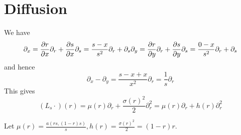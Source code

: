 \documentclass{article}
\begin{document}
{\section{Diffusion}

We have
\[
\partial_x
= \frac{\partial r}{\partial x}\partial_r + \frac{\partial s}{\partial x}\partial_s
= \frac{s - x}{s^2}\partial_r + \partial_s
\\\partial_y
= \frac{\partial r}{\partial y}\partial_r + \frac{\partial s}{\partial y}\partial_s
= \frac{0 - x}{s^2}\partial_r + \partial_s
\]
and hence
\[
\partial_x - \partial_y
= \frac{s - x + x}{x^2}\partial_r
= \frac{1}{s}\partial_r
\]
This gives
\[
(L_s \cdot)(r)
= \mu(r) \partial_r + \frac{\sigma(r)^2}{2} \partial_r^2
= \mu(r) \partial_r + h(r) \partial_r^2
\]

Let $\mu(r) = \frac{a(rs, (1-r)s)}{s}, h(r) = \frac{\sigma(r)^2}{2}=(1-r)r$.


}
\end{document}
